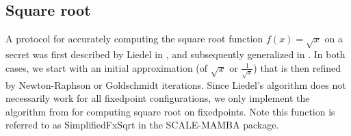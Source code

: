\subsection{Square root}

A protocol for accurately computing the square root function $f(x) = \sqrt{x}$ on a
secret was first described by Liedel in \cite{Liedel2012SecureDC}, and subsequently
generalized in \cite{ACNS:AlySma19}. In both cases, we start with an initial
approximation (of $\sqrt{x}$ or $\frac{1}{\sqrt{x}}$) that is then refined by
Newton-Raphson or Goldschmidt iterations. Since Liedel's algorithm does not
necessarily work for all fixedpoint configurations, we only implement the algorithm
from \cite{ACNS:AlySma19} for computing square root on fixedpoints. Note this
function is referred to as SimplifiedFxSqrt in the SCALE-MAMBA package.
